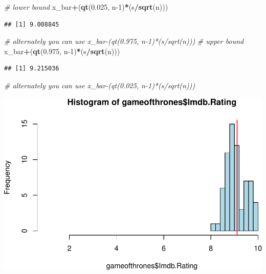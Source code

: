 \documentclass[]{article}
\newenvironment{Shaded}{\begin{snugshade}}{\end{snugshade}}
\newcommand{\CommentTok}[1]{\textcolor[rgb]{0.56,0.35,0.01}{\textit{#1}}}
\newcommand{\DecValTok}[1]{\textcolor[rgb]{0.00,0.00,0.81}{#1}}
\newcommand{\FloatTok}[1]{\textcolor[rgb]{0.00,0.00,0.81}{#1}}
\newcommand{\KeywordTok}[1]{\textcolor[rgb]{0.13,0.29,0.53}{\textbf{#1}}}
\newcommand{\NormalTok}[1]{#1}
\newcommand{\OperatorTok}[1]{\textcolor[rgb]{0.81,0.36,0.00}{\textbf{#1}}}
\begin{document}
\begin{Shaded}
\begin{Highlighting}[]
\CommentTok{# lower bound}
\NormalTok{x_bar}\OperatorTok{+}\NormalTok{(}\KeywordTok{qt}\NormalTok{(}\FloatTok{0.025}\NormalTok{, n}\DecValTok{-1}\NormalTok{)}\OperatorTok{*}\NormalTok{(s}\OperatorTok{/}\KeywordTok{sqrt}\NormalTok{(n))) }
\end{Highlighting}
\end{Shaded}

\begin{verbatim}
## [1] 9.008845
\end{verbatim}

\begin{Shaded}
\begin{Highlighting}[]
\CommentTok{# alternately you can use x_bar-(qt(0.975, n-1)*(s/sqrt(n)))}
\CommentTok{# upper bound}
\NormalTok{x_bar}\OperatorTok{+}\NormalTok{(}\KeywordTok{qt}\NormalTok{(}\FloatTok{0.975}\NormalTok{, n}\DecValTok{-1}\NormalTok{)}\OperatorTok{*}\NormalTok{(s}\OperatorTok{/}\KeywordTok{sqrt}\NormalTok{(n))) }
\end{Highlighting}
\end{Shaded}

\begin{verbatim}
## [1] 9.215036
\end{verbatim}

\begin{Shaded}
\begin{Highlighting}[]
\CommentTok{# alternately you can use x_bar-(qt(0.025, n-1)*(s/sqrt(n)))}
\end{Highlighting}
\end{Shaded}

\begin{Shaded}
\end{Shaded}

\includegraphics{FinalProject_files/figure-latex/unnamed-chunk-17-1.pdf}
\end{document}

